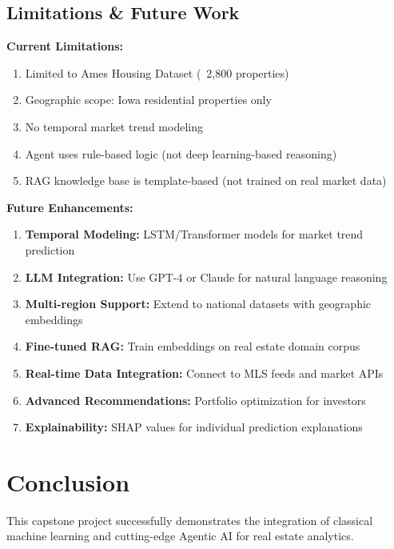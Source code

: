\documentclass[11pt,a4paper]{article}
\begin{document}
\subsection{Limitations \& Future Work}

\textbf{Current Limitations:}
\begin{enumerate}
    \item Limited to Ames Housing Dataset (~2,800 properties)
    \item Geographic scope: Iowa residential properties only
    \item No temporal market trend modeling
    \item Agent uses rule-based logic (not deep learning-based reasoning)
    \item RAG knowledge base is template-based (not trained on real market data)
\end{enumerate}

\textbf{Future Enhancements:}
\begin{enumerate}
    \item \textbf{Temporal Modeling:} LSTM/Transformer models for market trend prediction
    \item \textbf{LLM Integration:} Use GPT-4 or Claude for natural language reasoning
    \item \textbf{Multi-region Support:} Extend to national datasets with geographic embeddings
    \item \textbf{Fine-tuned RAG:} Train embeddings on real estate domain corpus
    \item \textbf{Real-time Data Integration:} Connect to MLS feeds and market APIs
    \item \textbf{Advanced Recommendations:} Portfolio optimization for investors
    \item \textbf{Explainability:} SHAP values for individual prediction explanations
\end{enumerate}

\pagebreak

\section{Conclusion}

This capstone project successfully demonstrates the integration of classical machine learning and cutting-edge Agentic AI for real estate analytics.
\end{document}
